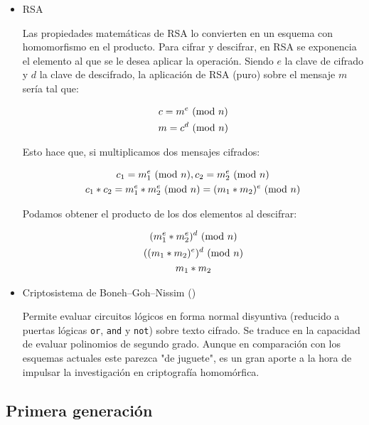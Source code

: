 \begin{itemize}

    \item RSA

    Las propiedades matemáticas de RSA lo convierten en un esquema con homomorfismo en el producto. Para cifrar y descifrar, en RSA se exponencia el elemento al que se le desea aplicar la operación. Siendo $e$ la clave de cifrado y $d$ la clave de descifrado, la aplicación de RSA (puro) sobre el mensaje $m$ sería tal que:

    \begin{gather*}
        c = m^e \ (\mathrm{mod}\ n) \\
        m = c^d \ (\mathrm{mod}\ n)
    \end{gather*}

    Esto hace que, si multiplicamos dos mensajes cifrados:

    \begin{gather*}
        c_1 = m_1^e \ (\mathrm{mod}\ n), c_2 = m_2^e \ (\mathrm{mod}\ n) \\
        c_1 * c_2 = m_1^e * m_2^e \ (\mathrm{mod}\ n) = (m_1*m_2)^e \ (\mathrm{mod}\ n)
    \end{gather*}

    Podamos obtener el producto de los dos elementos al descifrar:

    \begin{gather*}
        \label{form:rsa_product}
        (m_1^e * m_2^e)^d \ (\mathrm{mod}\ n) \\
        ((m_1*m_2)^e)^d \ (\mathrm{mod}\ n) \\
        m_1 * m_2
    \end{gather*}

    \item Criptosistema de Boneh–Goh–Nissim (\cite{hutchison_evaluating_2005})

    Permite evaluar circuitos lógicos en forma normal disyuntiva (reducido a puertas lógicas \verb|or|, \verb|and| y \verb|not|) sobre texto cifrado. Se traduce en la capacidad de evaluar polinomios de segundo grado. Aunque en comparación con los esquemas actuales este parezca "de juguete", es un gran aporte a la hora de impulsar la investigación en criptografía homomórfica.

\end{itemize}

\subsection{Primera generación}

